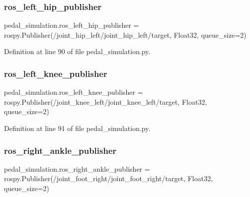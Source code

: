 \subsubsection{\texorpdfstring{ros\_left\_hip\_publisher}{ros\_left\_hip\_publisher}}
{\footnotesize\ttfamily pedal\+\_\+simulation.\+ros\+\_\+left\+\_\+hip\+\_\+publisher = rospy.\+Publisher(\textquotesingle{}/joint\+\_\+hip\+\_\+left/joint\+\_\+hip\+\_\+left/target\textquotesingle{}, Float32, queue\+\_\+size=2)}



Definition at line 90 of file pedal\+\_\+simulation.\+py.

\mbox{\label{namespacepedal__simulation_ae4ce94ab5921ff0932ebb8fca1a0cce3}} 
\subsubsection{\texorpdfstring{ros\_left\_knee\_publisher}{ros\_left\_knee\_publisher}}
{\footnotesize\ttfamily pedal\+\_\+simulation.\+ros\+\_\+left\+\_\+knee\+\_\+publisher = rospy.\+Publisher(\textquotesingle{}/joint\+\_\+knee\+\_\+left/joint\+\_\+knee\+\_\+left/target\textquotesingle{}, Float32, queue\+\_\+size=2)}



Definition at line 91 of file pedal\+\_\+simulation.\+py.

\mbox{\label{namespacepedal__simulation_a80c8e80dd018d69b15af48f30b9af705}} 
\subsubsection{\texorpdfstring{ros\_right\_ankle\_publisher}{ros\_right\_ankle\_publisher}}
{\footnotesize\ttfamily pedal\+\_\+simulation.\+ros\+\_\+right\+\_\+ankle\+\_\+publisher = rospy.\+Publisher(\textquotesingle{}/joint\+\_\+foot\+\_\+right/joint\+\_\+foot\+\_\+right/target\textquotesingle{}, Float32, queue\+\_\+size=2)}



